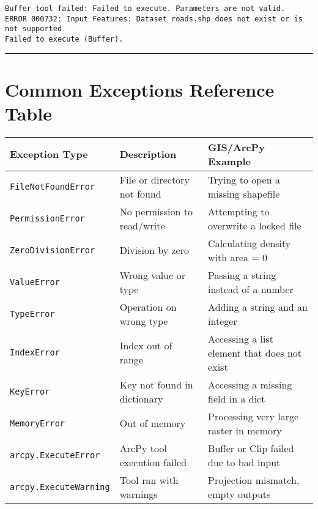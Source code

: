 \documentclass[
  11pt,
  letterpaper,
]{book}
\begin{document}
\begin{verbatim}
Buffer tool failed: Failed to execute. Parameters are not valid.
ERROR 000732: Input Features: Dataset roads.shp does not exist or is not supported
Failed to execute (Buffer).
\end{verbatim}

\begin{center}\rule{0.5\linewidth}{0.5pt}\end{center}

\section{Common Exceptions Reference
Table}\label{common-exceptions-reference-table}

\begin{longtable}[]{@{}
  >{\raggedright\arraybackslash}p{}
  >{\raggedright\arraybackslash}p{}
  >{\raggedright\arraybackslash}p{}@{}}
\toprule\noalign{}
\begin{minipage}[b]{\linewidth}\raggedright
Exception Type
\end{minipage} & \begin{minipage}[b]{\linewidth}\raggedright
Description
\end{minipage} & \begin{minipage}[b]{\linewidth}\raggedright
GIS/ArcPy Example
\end{minipage} \\
\midrule\noalign{}
\endhead
\bottomrule\noalign{}
\endlastfoot
\texttt{FileNotFoundError} & File or directory not found & Trying to
open a missing shapefile \\
\texttt{PermissionError} & No permission to read/write & Attempting to
overwrite a locked file \\
\texttt{ZeroDivisionError} & Division by zero & Calculating density with
area = 0 \\
\texttt{ValueError} & Wrong value or type & Passing a string instead of
a number \\
\texttt{TypeError} & Operation on wrong type & Adding a string and an
integer \\
\texttt{IndexError} & Index out of range & Accessing a list element that
does not exist \\
\texttt{KeyError} & Key not found in dictionary & Accessing a missing
field in a dict \\
\texttt{MemoryError} & Out of memory & Processing very large raster in
memory \\
\texttt{arcpy.ExecuteError} & ArcPy tool execution failed & Buffer or
Clip failed due to bad input \\
\texttt{arcpy.ExecuteWarning} & Tool ran with warnings & Projection
mismatch, empty outputs \\
\end{longtable}
\end{document}
